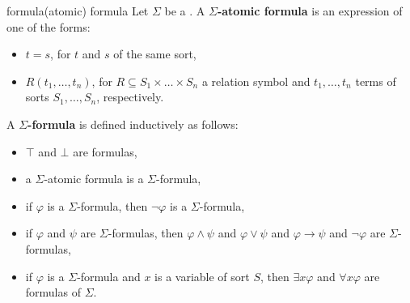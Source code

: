 \begin{topic}{formula}{(atomic) formula}
    Let $\Sigma$ be a . A \textbf{$\Sigma$-atomic formula} is an expression of one of the forms:
    \begin{itemize}
        \item $t = s$, for $t$ and $s$  of the same sort,
        \item $R(t_1, \ldots, t_n)$, for $R \subseteq S_1 \times \ldots \times S_n$ a relation symbol and $t_1, \ldots, t_n$ terms of sorts $S_1, \ldots, S_n$, respectively.
    \end{itemize}
    A \textbf{$\Sigma$-formula} is defined inductively as follows:
    \begin{itemize}
        \item $\top$ and $\bot$ are formulas,
        \item a $\Sigma$-atomic formula is a $\Sigma$-formula,
        \item if $\varphi$ is a $\Sigma$-formula, then $\neg \varphi$ is a $\Sigma$-formula,
        \item if $\varphi$ and $\psi$ are $\Sigma$-formulas, then $\varphi \land \psi$ and $\varphi \lor \psi$ and $\varphi \to \psi$ and $\neg \varphi$ are $\Sigma$-formulas,
        \item if $\varphi$ is a $\Sigma$-formula and $x$ is a variable of sort $S$, then $\exists x \varphi$ and $\forall x \varphi$ are formulas of $\Sigma$.
    \end{itemize}
\end{topic}

